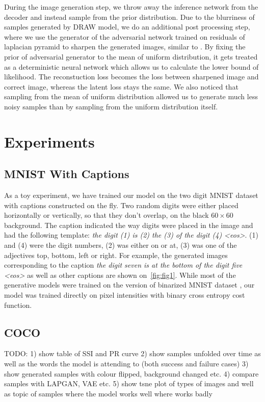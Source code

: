 \documentclass{article} %
\begin{document}
During the image generation step, we throw away the inference network from the decoder and instead sample from the prior distribution. Due to the blurriness of samples generated by DRAW model, we do an additional post processing step, where we use the generator of the adversarial network trained on residuals of laplacian pyramid to sharpen the generated images, similar to \citep{denton_lapgan}. By fixing the prior of adversarial generator to the mean of uniform distribution, it gets treated as a deterministic neural network which allows us to calculate the lower bound of likelihood. The reconstuction loss becomes the loss between sharpened image and correct image, whereas the latent loss stays the same. We also noticed that sampling from the mean of uniform distribution allowed us to generate much less noisy samples than by sampling from the uniform distribution itself.  

\section{Experiments}
\subsection{MNIST With Captions}
As a toy experiment, we have trained our model on the two digit MNIST dataset with captions constructed on the fly. Two random digits were either placed horizontally or vertically, so that they don't overlap, on the black $60 \times 60$ background. The caption indicated the way digits were placed in the image and had the following template: \textit{the digit (1) is (2) the (3) of the digit (4) \textless eos\textgreater}. (1) and (4) were the digit numbers, (2) was either on or at, (3) was one of the adjectives top, bottom, left or right. For example, the generated images corresponding to the caption \textit{the digit seven is at the bottom of the digit five \textless eos\textgreater} as well as other captions are shown on~\ref{fig:fig1}. While most of the generative models were trained on the version of binarized MNIST dataset \citep{russ_binarizedmnist}, our model was trained directly on pixel intensities with binary cross entropy cost function.

\subsection{COCO}
TODO:
1) show table of SSI and PR curve
2) show samples unfolded over time as well as the words the model is attending to (both success and failure cases)
3) show generated samples with colour flipped, background changed etc.
4) compare samples with LAPGAN, VAE etc.
5) show tsne plot of types of images and well as topic of samples where the model works well where works badly
\end{document}
